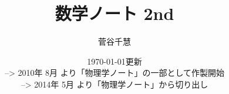 ﻿%
    \title{
        \Huge{数学ノート 2nd}
    }

    \author{
        菅谷\;\;\;千慧
    }

    \date{
        \today \quad 更新\\
        {\small --> 2010年 8月 より「物理学ノート」の一部として作製開始} \\
        {\small --> 2014年 5月 より「物理学ノート」から切り出し}
    }
    \par
